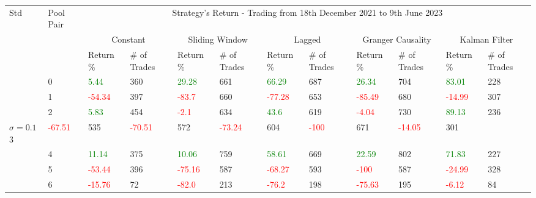 \begin{table}[!htb]
    \centering
    \begin{adjustwidth}{-0.8in}{-0.9in}
        \begin{tabular}{|p{4em}|p{2em}|p{3em}|p{3em}|p{3em}|p{3em}|p{3em}|p{3em}|p{3em}|p{3em}|p{3em}|p{3em}|}\hline
            Std & Pool Pair & \multicolumn{10}{|c|}{Strategy's Return - Trading from 18th December 2021 to 9th June 2023} \\\cline{3-12}
            &   & \multicolumn{2}{|c|}{Constant} & \multicolumn{2}{|c|}{Sliding Window} & \multicolumn{2}{|c|}{Lagged} & \multicolumn{2}{|c|}{Granger Causality} & \multicolumn{2}{|c|}{Kalman Filter}\\\cline{3-12}
            & & Return \% & \# of Trades & Return \% & \# of Trades & Return \% & \# of Trades & Return \% & \# of Trades & Return \% & \# of Trades\\\hline

            & 0 & \textcolor{green}{5.44} & 360 & \textcolor{green}{29.28} & 661 & \textcolor{green}{66.29} & 687 & \textcolor{green}{26.34} & 704 & \textcolor{green}{83.01} & 228\\\cline{3-12}
            & 1 & \textcolor{red}{-54.34} & 397 & \textcolor{red}{-83.7} & 660 & \textcolor{red}{-77.28} & 653 & \textcolor{red}{-85.49} & 680 & \textcolor{red}{-14.99} & 307\\\cline{3-12}
            & 2 & \textcolor{green}{5.83} & 454 & \textcolor{red}{-2.1} & 634 & \textcolor{green}{43.6} & 619 & \textcolor{red}{-4.04} & 730 & \textcolor{green}{89.13} & 236\\\cline{3-12}
            $\sigma=0.1$3 & \textcolor{red}{-67.51} & 535 & \textcolor{red}{-70.51} & 572 & \textcolor{red}{-73.24} & 604 & \textcolor{red}{-100} & 671 & \textcolor{red}{-14.05} & 301\\\cline{3-12}
            & 4 & \textcolor{green}{11.14} & 375 & \textcolor{green}{10.06} & 759 & \textcolor{green}{58.61} & 669 & \textcolor{green}{22.59} & 802 & \textcolor{green}{71.83} & 227\\\cline{3-12}
            & 5 & \textcolor{red}{-53.44} & 396 & \textcolor{red}{-75.16} & 587 & \textcolor{red}{-68.27} & 593 & \textcolor{red}{-100} & 587 & \textcolor{red}{-24.99} & 328\\\cline{3-12}
            & 6 & \textcolor{red}{-15.76} & 72 & \textcolor{red}{-82.0} & 213 & \textcolor{red}{-76.2} & 198 & \textcolor{red}{-75.63} & 195 & \textcolor{red}{-6.12} & 84\\\hline\hline


\end{tabular}
\end{adjustwidth}
\end{table}
